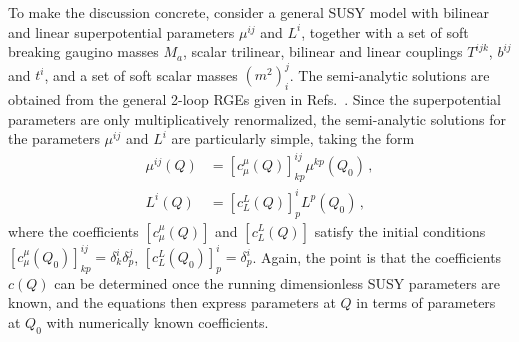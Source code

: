 \documentclass[final,3p,11pt,pdflatex]{elsarticle}
\newcommand{\scoeff}[2]{[ c^{#1}_{#2}(Q) ]}
\begin{document}
To make the discussion concrete, consider a general SUSY model with bilinear
and linear superpotential parameters $\mu^{ij}$ and $L^i$, together with a set
of soft breaking gaugino masses $M_a$, scalar trilinear, bilinear and linear
couplings $T^{ijk}$, $b^{ij}$ and $t^i$, and a set of soft scalar masses
$(m^2)_i^j$.  The semi-analytic solutions are obtained from the general 2-loop
RGEs given in Refs.~\cite{Martin:1993zk,Yamada:1994id,Fonseca:2011vn}.
Since the superpotential parameters are only multiplicatively
renormalized, the semi-analytic solutions for the parameters $\mu^{ij}$
and $L^i$ are particularly simple, taking the form
\begin{align}
  \mu^{ij}(Q) &= \scoeff{\mu}{\mu}^{ij}_{kp} \mu^{kp}(Q_0) \, ,
  \label{eq:general-susy-bilinear-solution} \\
  L^i(Q) &= \scoeff{L}{L}^i_p L^p(Q_0) \, ,
  \label{eq:general-susy-linear-solution}
\end{align}
where the coefficients $\scoeff{\mu}{\mu}$ and $\scoeff{L}{L}$ satisfy the
initial conditions $[c^\mu_\mu(Q_0)]^{ij}_{kp} = \delta^i_k
\delta^j_p$, $[c^L_L(Q_0)]^i_p = \delta^i_p$. Again, the point is that
the coefficients $c(Q)$ can be determined once the
running dimensionless SUSY parameters are known, and the equations then express
parameters at $Q$ in  terms of parameters at $Q_0$ with numerically known
coefficients.
\end{document}
